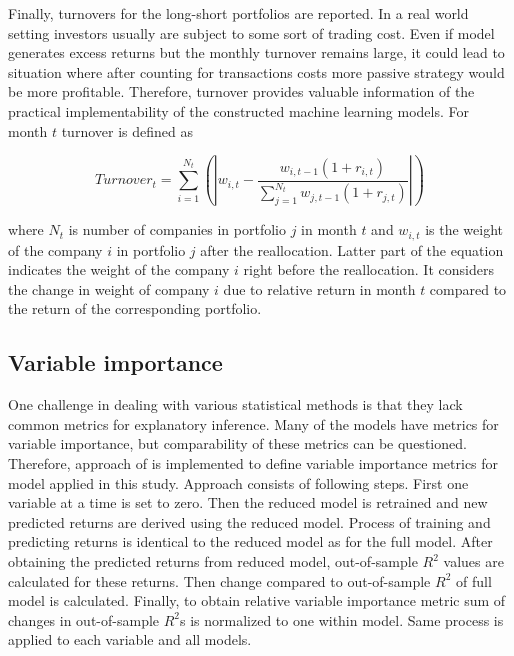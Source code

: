 \documentclass[12pt]{article}
\begin{document}
Finally, turnovers for the long-short portfolios are reported. In a real world setting investors usually are subject to some sort of trading cost. Even if model generates excess returns but the monthly turnover remains large, it could lead to situation where after counting for transactions costs more passive strategy would be more profitable. Therefore, turnover provides valuable information of the practical implementability of the constructed machine learning models. For month $t$ turnover is defined as \par

\begin{equation}
\label{eq:Turnover}
Turnover_t = \sum_{i=1}^{N_t}  \left ( \left | w_{i, t} - \frac{w_{i, t-1}(1 + r_{i, t})}{ \sum_{j=1}^{N_{t}} w_{j, t-1}(1 + r_{j, t})} \right | \right )
\end{equation}

where $N_t$ is number of companies in portfolio $j$ in month $t$ and $w_{i, t}$ is the weight of the company $i$ in portfolio $j$ after the reallocation. Latter part of the equation indicates the weight of the company $i$ right before the reallocation. It considers the change in weight of company $i$ due to relative return in month $t$ compared to the return of the corresponding portfolio.

\subsection{Variable importance} \label{VariableImportance}

One challenge in dealing with various statistical methods is that they lack common metrics for explanatory inference. Many of the models have metrics for variable importance, but comparability of these metrics can be questioned. Therefore, approach of \citet{guetal} is implemented to define variable importance metrics for model applied in this study. Approach consists of following steps. First one variable at a time is set to zero. Then the reduced model is retrained and new predicted returns are derived using the reduced model. Process of training and predicting returns is identical to the reduced model as for the full model. After obtaining the predicted returns from reduced model, out-of-sample $R^2$ values are calculated for these returns. Then change compared to out-of-sample $R^2$ of full model is calculated. Finally, to obtain relative variable importance metric sum of changes in out-of-sample $R^2$s is normalized to one within model. Same process is applied to each variable and all models. \par
\end{document}
